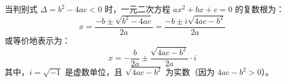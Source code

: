 \documentclass[UTF8]{ctexart} %
\begin{document}
当判别式 \( \Delta = b^2 - 4ac < 0 \) 时，一元二次方程 \( ax^2 + bx + c = 0 \) 的复数根为：
\[
x = \frac{-b \pm \sqrt{b^2 - 4ac}}{2a} = \frac{-b \pm i \sqrt{4ac - b^2}}{2a}
\]
或等价地表示为：
\[
x = -\frac{b}{2a} \pm \frac{\sqrt{4ac - b^2}}{2a} \cdot i
\]
其中，\( i = \sqrt{-1} \) 是虚数单位，且 \( \sqrt{4ac - b^2} \) 为实数（因为 \( 4ac - b^2 > 0 \)）。
\end{document}

